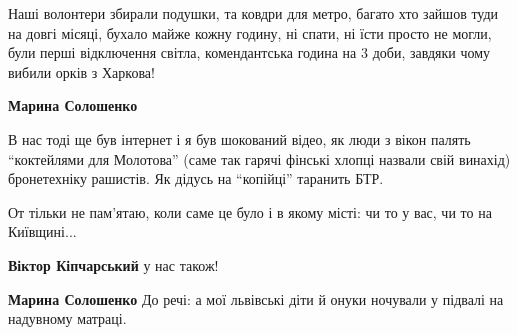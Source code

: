  
 
 
 
 

\qqSecCmt


Наші волонтери збирали подушки, та ковдри для метро, багато хто зайшов туди на
довгі місяці, бухало майже кожну годину, ні спати, ні їсти просто не могли,
були перші відключення світла, комендантська година на 3 доби, завдяки чому
вибили орків з Харкова!

\begin{itemize} %
\textbf{Марина Солошенко} 

В нас тоді ще був інтернет і я був шокований відео, як люди з вікон палять
\enquote{коктейлями для Молотова} (саме так гарячі фінські хлопці назвали свій винахід)
бронетехніку рашистів. Як дідусь на \enquote{копійці} таранить БТР.

От тільки не пам'ятаю, коли саме це було і в якому місті: чи то у вас, чи то на
Київщині...

\textbf{Віктор Кіпчарський} у нас також!

\textbf{Марина Солошенко} До речі: а мої львівські діти й онуки ночували у підвалі на надувному матраці.
\end{itemize} %
